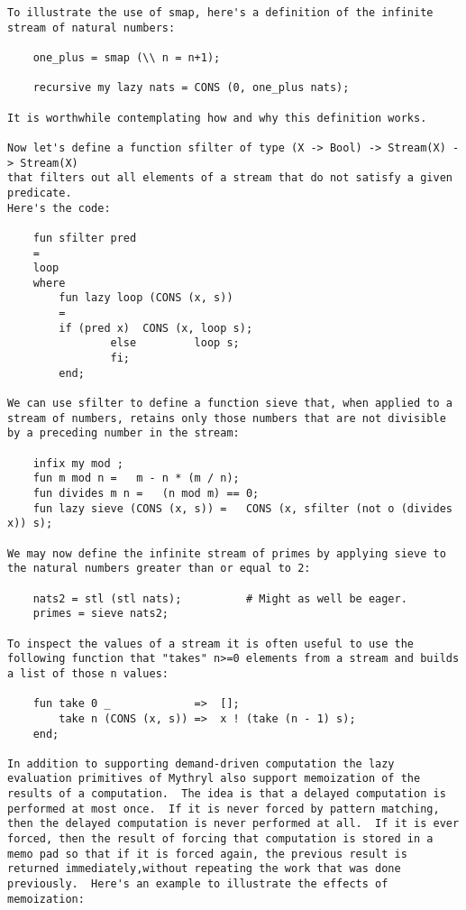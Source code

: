 \begin{verbatim}
To illustrate the use of smap, here's a definition of the infinite 
stream of natural numbers: 
 
    one_plus = smap (\\ n = n+1);  
  
    recursive my lazy nats = CONS (0, one_plus nats); 
 
It is worthwhile contemplating how and why this definition works. 
 
Now let's define a function sfilter of type (X -> Bool) -> Stream(X) -> Stream(X) 
that filters out all elements of a stream that do not satisfy a given predicate. 
Here's the code: 
 
    fun sfilter pred 
	= 
	loop 
	where 
	    fun lazy loop (CONS (x, s)) 
		= 
		if (pred x)  CONS (x, loop s); 
                else         loop s; 
                fi; 
        end; 
  
We can use sfilter to define a function sieve that, when applied to a 
stream of numbers, retains only those numbers that are not divisible 
by a preceding number in the stream: 
 
    infix my mod ;  
    fun m mod n =   m - n * (m / n);  
    fun divides m n =   (n mod m) == 0;  
    fun lazy sieve (CONS (x, s)) =   CONS (x, sfilter (not o (divides x)) s);  
 
We may now define the infinite stream of primes by applying sieve to 
the natural numbers greater than or equal to 2: 
 
    nats2 = stl (stl nats);          # Might as well be eager.  
    primes = sieve nats2; 
 
To inspect the values of a stream it is often useful to use the 
following function that "takes" n>=0 elements from a stream and builds 
a list of those n values: 
 
    fun take 0 _             =>  []; 
        take n (CONS (x, s)) =>  x ! (take (n - 1) s); 
    end;  
 
In addition to supporting demand-driven computation the lazy 
evaluation primitives of Mythryl also support memoization of the 
results of a computation.  The idea is that a delayed computation is 
performed at most once.  If it is never forced by pattern matching, 
then the delayed computation is never performed at all.  If it is ever 
forced, then the result of forcing that computation is stored in a 
memo pad so that if it is forced again, the previous result is 
returned immediately,without repeating the work that was done 
previously.  Here's an example to illustrate the effects of 
memoization: 
 

\end{verbatim}
